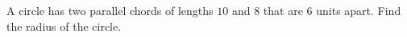 A circle has two parallel chords of lengths $10$ and $8$ that are $6$ units apart. Find the radius of the circle.
